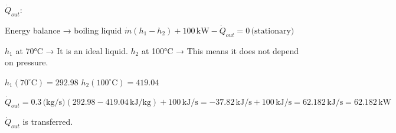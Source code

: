 \( \dot{Q}_{out} \):  

Energy balance → boiling liquid  
\( \dot{m} (h_1 - h_2) + 100 \, \text{kW} - \dot{Q}_{out} = 0 \, \text{(stationary)} \)  

\( h_1 \) at 70°C → It is an ideal liquid.  
\( h_2 \) at 100°C → This means it does not depend on pressure.  

\( h_1 (70^\circ \text{C}) = 292.98 \)  
\( h_2 (100^\circ \text{C}) = 419.04 \)  

\( \dot{Q}_{out} = 0.3 \, \text{(kg/s)} \left(292.98 - 419.04 \, \text{kJ/kg}\right) + 100 \, \text{kJ/s} = -37.82 \, \text{kJ/s} + 100 \, \text{kJ/s} = 62.182 \, \text{kJ/s} = 62.182 \, \text{kW} \)  

\( \dot{Q}_{out} \) is transferred.